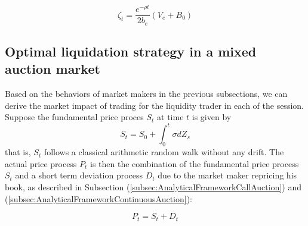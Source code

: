 \documentclass{article}
\begin{document}
\begin{equation}\label{resilence_term}
  \zeta_t = \frac{e^{-\rho t}}{2 b_e}  (V_e + B_0)
\end{equation}

\subsection{Optimal liquidation strategy in a mixed auction market}

Based on the behaviors of market makers in the previous subsections, we can derive the market impact of trading for the liquidity trader in each of the session. Suppose the fundamental price proces $S_t$ at time $t$ is given by
\[
  S_t = S_0 + \int_0^t \sigma dZ_s
\]
that is, $S_t$ follows a classical arithmetic random walk without any drift. The actual price process $P_t$ is then the combination of the fundamental price process $S_t$ and a short term deviation process $D_t$ due to the market maker repricing his book, as described in Subsection (\ref{subsec:AnalyticalFrameworkCallAuction}) and (\ref{subsec:AnalyticalFrameworkContinuousAuction}):

\[
  P_t = S_t + D_t
\]
\end{document}

